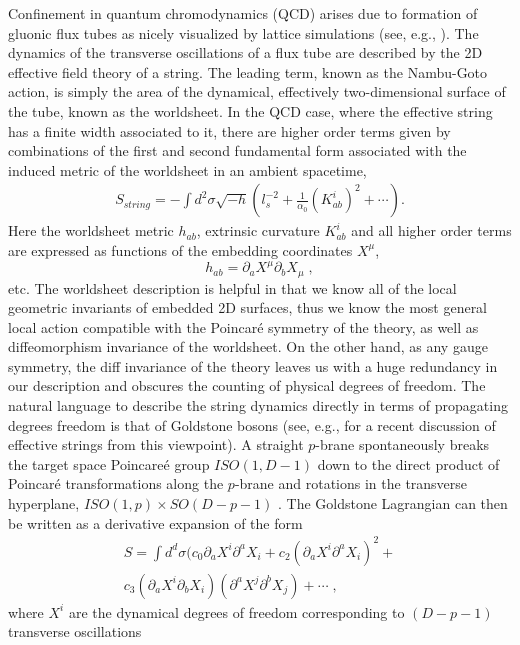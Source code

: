\documentclass[%
 reprint,
 amsmath,amssymb,
 aps,
]{revtex4-1}
\begin{document}
Confinement in quantum chromodynamics (QCD) arises due to formation of
gluonic flux tubes as nicely visualized by lattice simulations (see, e.g.,  \cite{Bissey:2006bz}).
The dynamics of the transverse oscillations of a flux tube are
described by the 2D effective field theory of a string. The leading term, known as the
Nambu-Goto action, is simply the area of the dynamical, effectively two-dimensional surface
of the tube, known as the worldsheet. In the QCD case, where the effective string has a finite
width associated to it, there are higher order terms given by combinations of the first
and second fundamental form associated with the induced metric
 of the worldsheet in an
ambient spacetime,
\begin{eqnarray}
\label{diffaction}
    S_{string} = - \int d^2 \sigma \sqrt{- h} \left(
    l_s^{-2} + \frac{1}{\alpha_0} (K^i_{ab})^2 + \cdots \right).
\end{eqnarray}
Here the worldsheet metric $h_{ab}$, extrinsic curvature $K^i_{ab}$ and all higher order terms are expressed as functions of the embedding coordinates $X^\mu$,
\[
h_{ab}=\partial_a X^\mu\partial_bX_\mu\;,
\]
etc.
The worldsheet description is helpful in that we know all
of the local geometric invariants of embedded 2D surfaces, thus we know the most general
local action compatible with the Poincar\'e symmetry of the theory, as
well as diffeomorphism invariance of the worldsheet. On the other hand, as any gauge symmetry, the
diff invariance of the theory leaves us with a huge redundancy in our description and obscures the counting of physical degrees of freedom.
 The natural language to describe the string dynamics directly in terms of propagating degrees freedom  is that of Goldstone bosons
 (see, e.g., \cite{Dubovsky:2012sh} for a recent discussion of effective strings from this viewpoint).
 A  straight $p$-brane spontaneously breaks the target space Poincare\'e group $ISO(1,D-1)$ down to the direct product of Poincar\'e
 transformations along the $p$-brane and rotations in the transverse hyperplane,
  $ISO(1,p)\times SO(D-p-1)$ . The Goldstone Lagrangian can then be written
as a derivative expansion of the form
\begin{eqnarray}
\label{action}
    S =  \int d^d \sigma (c_0 \partial_a X^i \partial^a X_i +
    c_2 (\partial_a X^i \partial^a X_i)^2 +  \\
    c_3 (\partial_a X^i \partial_b X_i)(\partial^a X^j \partial^b X_j) + \cdots \; , \nonumber
\end{eqnarray}
where $X^i$ are
the dynamical degrees of freedom  corresponding to  $(D-p-1)$ transverse oscillations
\end{document}
